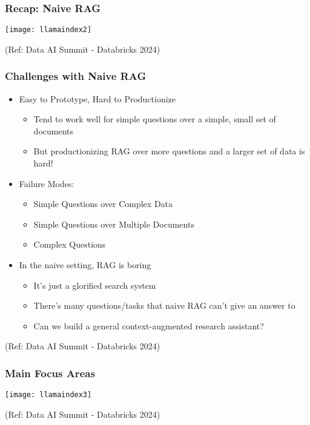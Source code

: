 \begin{frame}[fragile]\frametitle{Recap: Naive RAG}

\begin{center}
\texttt{[image: llamaindex2]}

{\tiny (Ref: Data AI Summit - Databricks 2024)}
\end{center}
\end{frame}


\begin{frame}[fragile]\frametitle{Challenges with Naive RAG}


\begin{itemize}
\item Easy to Prototype, Hard to Productionize
	\begin{itemize}
	\item Tend to work well for simple questions over a simple, small set of documents
	\item But productionizing RAG over more questions and a larger set of data is hard!
	\end{itemize}	
\item Failure Modes:
	\begin{itemize}
	\item Simple Questions over Complex Data
	\item Simple Questions over Multiple Documents
	\item Complex Questions 
	\end{itemize}	
\item In the naive setting, RAG is boring
	\begin{itemize}
	\item It's just a glorified search system
	\item There's many questions/tasks that naive RAG can’t give an answer to
	\item Can we build a general context-augmented research assistant?
	\end{itemize}		
\end{itemize}	

{\tiny (Ref: Data AI Summit - Databricks 2024)}

\end{frame}

\begin{frame}[fragile]\frametitle{Main Focus Areas}

\begin{center}
\texttt{[image: llamaindex3]}

{\tiny (Ref: Data AI Summit - Databricks 2024)}
\end{center}
\end{frame}

